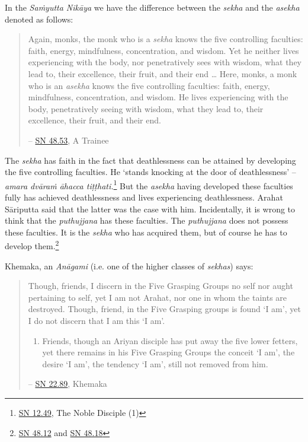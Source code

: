 In the \emph{Saṁyutta Nikāya} we have the difference between the \emph{sekha} and the \emph{asekha} denoted as follows:

\begin{quote}
Again, monks, the monk who is a \emph{sekha} knows the five controlling faculties: faith, energy, mindfulness, concentration, and wisdom. Yet he neither lives experiencing with the body, nor penetratively sees with wisdom, what they lead to, their excellence, their fruit, and their end \ldots\hspace{0pt} Here, monks, a monk who is an \emph{asekha} knows the five controlling faculties: faith, energy, mindfulness, concentration, and wisdom. He lives experiencing with the body, penetratively seeing with wisdom, what they lead to, their excellence, their fruit, and their end.

 -- \href{https://suttacentral.net/sn48.53/en/sujato}{SN 48.53}, A Trainee
\end{quote}

The \emph{sekha} has faith in the fact that deathlessness can be attained by developing the five controlling faculties. He `stands knocking at the door of deathlessness' -- \emph{amara dvāraṁ āhacca tiṭṭhati.}\footnote{\href{https://suttacentral.net/sn12.49/en/bodhi}{SN 12.49}, The Noble Disciple (1)} But the \emph{asekha} having developed these faculties fully has achieved deathlessness and lives experiencing deathlessness. Arahat Sāriputta said that the latter was the case with him. Incidentally, it is wrong to think that the \emph{puthujjana} has these faculties. The \emph{puthujjana} does not possess these faculties. It is the \emph{sekha} who has acquired them, but of course he has to develop them.\footnote{\href{https://suttacentral.net/sn48.12/en/sujato}{SN 48.12} and \href{https://suttacentral.net/sn48.18/en/sujato}{SN 48.18}}

Khemaka, an \emph{Anāgami} (i.e. one of the higher classes of \emph{sekhas}) says:

\begin{quote}
Though, friends, I discern in the Five Grasping Groups no self nor aught pertaining to self, yet I am not Arahat, nor one in whom the taints are destroyed. Though, friend, in the Five Grasping groups is found `I am', yet I do not discern that I am this `I am'.

\begin{enumerate}
\def\labelenumi{\roman{enumi}.}
\item
  Friends, though an Ariyan disciple has put away the five lower fetters, yet there remains in his Five Grasping Groups the conceit `I am', the desire `I am', the tendency `I am', still not removed from him.
\end{enumerate}

 -- \href{https://suttacentral.net/sn22.89/en/bodhi}{SN 22.89}, Khemaka
\end{quote}

